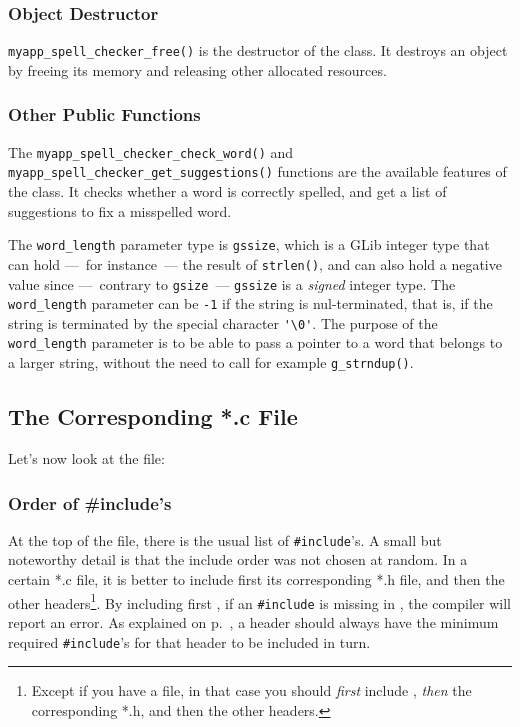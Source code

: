 
\subsubsection{Object Destructor}
\lstinline{myapp_spell_checker_free()} is the destructor of the class. It destroys an object by freeing its memory and releasing other allocated resources.

\subsubsection{Other Public Functions}
The \lstinline{myapp_spell_checker_check_word()} and \lstinline{myapp_spell_checker_get_suggestions()} functions are the available features of the class. It checks whether a word is correctly spelled, and get a list of suggestions to fix a misspelled word.

The \lstinline{word_length} parameter type is \lstinline{gssize}, which is a GLib integer type that can hold ---~for instance~--- the result of \lstinline{strlen()}, and can also hold a negative value since ---~contrary to \lstinline{gsize}~--- \lstinline{gssize} is a \emph{signed} integer type. The \lstinline{word_length} parameter can be \lstinline{-1} if the string is nul-terminated, that is, if the string is terminated by the special character \lstinline{'\0'}. The purpose of the \lstinline{word_length} parameter is to be able to pass a pointer to a word that belongs to a larger string, without the need to call for example \lstinline{g_strndup()}.

\subsection{The Corresponding *.c File}

Let's now look at the  file:

\vspace{0.7cm}


\subsubsection{Order of \#include's}
At the top of the file, there is the usual list of \lstinline{#include}'s. A small but noteworthy detail is that the include order was not chosen at random. In a certain *.c file, it is better to include first its corresponding *.h file, and then the other headers\footnote{Except if you have a  file, in that case you should \emph{first} include , \emph{then} the corresponding *.h, and then the other headers.}. By including first , if an \lstinline{#include} is missing in , the compiler will report an error. As explained on p.~\pageref{oop-include-in-header}, a header should always have the minimum required \lstinline{#include}'s for that header to be included in turn.


